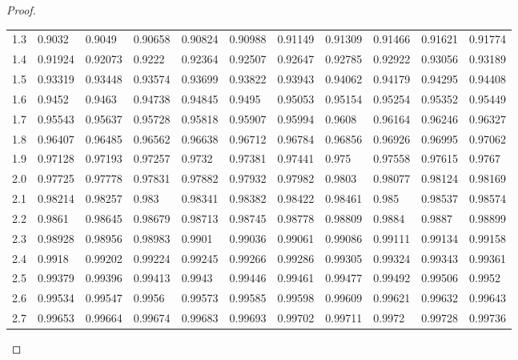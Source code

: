 \documentclass[%
<<<<<<< Updated upstream
<<<<<<< Updated upstream
11pt,%
twoside,%
titlepage,%
german,%
=======
=======
>>>>>>> Stashed changes
11pt,%
twoside,%
titlepage,%
swissgerman,%
<<<<<<< Updated upstream
>>>>>>> Stashed changes
=======
>>>>>>> Stashed changes
headsepline%
]{scrartcl}
\newcommand{\spaltenheight}{\rule{0mm}{3ex}}
\theoremstyle{definition}
\theoremstyle{plain}
\begin{document}
\begin{proof}
\begin{table}[]
{\begin{tabular}{l|llllllllll}
\rowcolor{Gray}\spaltenheight 1.3 & 0.9032  & 0.9049  & 0.90658 & 0.90824 & 0.90988 & 0.91149 & 0.91309 & 0.91466 & 0.91621 & 0.91774 \\
\rowcolor{lightyellow}\spaltenheight 1.4 & 0.91924 & 0.92073 & 0.9222  & 0.92364 & 0.92507 & 0.92647 & 0.92785 & 0.92922 & 0.93056 & 0.93189 \\
\rowcolor{Gray}\spaltenheight 1.5 & 0.93319 & 0.93448 & 0.93574 & 0.93699 & 0.93822 & 0.93943 & 0.94062 & 0.94179 & 0.94295 & 0.94408 \\
\rowcolor{lightyellow}\spaltenheight 1.6 & 0.9452  & 0.9463  & 0.94738 & 0.94845 & 0.9495  & 0.95053 & 0.95154 & 0.95254 & 0.95352 & 0.95449 \\
\rowcolor{Gray}\spaltenheight 1.7 & 0.95543 & 0.95637 & 0.95728 & 0.95818 & 0.95907 & 0.95994 & 0.9608  & 0.96164 & 0.96246 & 0.96327 \\
\rowcolor{lightyellow}\spaltenheight 1.8 & 0.96407 & 0.96485 & 0.96562 & 0.96638 & 0.96712 & 0.96784 & 0.96856 & 0.96926 & 0.96995 & 0.97062 \\
\rowcolor{Gray}\spaltenheight 1.9 & 0.97128 & 0.97193 & 0.97257 & 0.9732  & 0.97381 & 0.97441 & 0.975   & 0.97558 & 0.97615 & 0.9767  \\
\rowcolor{lightyellow}\spaltenheight 2.0   & 0.97725 & 0.97778 & 0.97831 & 0.97882 & 0.97932 & 0.97982 & 0.9803  & 0.98077 & 0.98124 & 0.98169 \\
\rowcolor{Gray}\spaltenheight 2.1 & 0.98214 & 0.98257 & 0.983   & 0.98341 & 0.98382 & 0.98422 & 0.98461 & 0.985   & 0.98537 & 0.98574 \\
\rowcolor{lightyellow}\spaltenheight 2.2 & 0.9861  & 0.98645 & 0.98679 & 0.98713 & 0.98745 & 0.98778 & 0.98809 & 0.9884  & 0.9887  & 0.98899 \\
\rowcolor{Gray}\spaltenheight 2.3 & 0.98928 & 0.98956 & 0.98983 & 0.9901  & 0.99036 & 0.99061 & 0.99086 & 0.99111 & 0.99134 & 0.99158 \\
\rowcolor{lightyellow}\spaltenheight 2.4 & 0.9918  & 0.99202 & 0.99224 & 0.99245 & 0.99266 & 0.99286 & 0.99305 & 0.99324 & 0.99343 & 0.99361 \\
\rowcolor{Gray}\spaltenheight 2.5 & 0.99379 & 0.99396 & 0.99413 & 0.9943  & 0.99446 & 0.99461 & 0.99477 & 0.99492 & 0.99506 & 0.9952  \\
\rowcolor{lightyellow}\spaltenheight 2.6 & 0.99534 & 0.99547 & 0.9956  & 0.99573 & 0.99585 & 0.99598 & 0.99609 & 0.99621 & 0.99632 & 0.99643 \\
\rowcolor{Gray}\spaltenheight 2.7 & 0.99653 & 0.99664 & 0.99674 & 0.99683 & 0.99693 & 0.99702 & 0.99711 & 0.9972  & 0.99728 & 0.99736 \\

\end{tabular}}
\end{table}
\end{proof}
\end{document}
